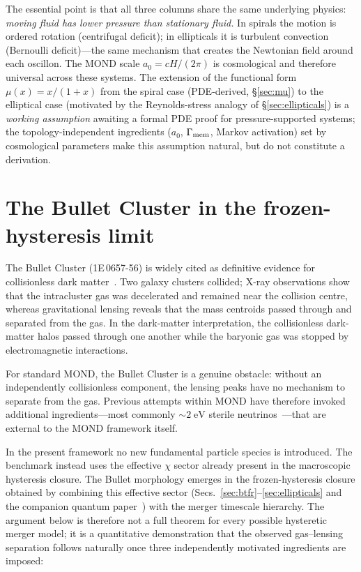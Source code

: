 \documentclass[11pt]{article}
\begin{document}
The essential point is that all three columns share the same
underlying physics: \emph{moving fluid has lower pressure than
stationary fluid.}  In spirals the motion is ordered rotation
(centrifugal deficit); in ellipticals it is turbulent convection
(Bernoulli deficit)---the same mechanism that creates the
Newtonian field around each oscillon.  The MOND scale
$a_0=cH/(2\pi)$ is cosmological and therefore universal across
these systems.  The extension of the functional form
$\mu(x)=x/(1+x)$ from the spiral case (PDE-derived,
§\ref{sec:mu}) to the elliptical case (motivated by the
Reynolds-stress analogy of §\ref{sec:ellipticals}) is a
\emph{working assumption} awaiting a formal PDE proof for
pressure-supported systems; the topology-independent
ingredients ($a_0$, $\Gamma_{\rm mem}$, Markov activation)
set by cosmological parameters make this assumption natural,
but do not constitute a derivation.

\section{The Bullet Cluster in the frozen-hysteresis limit}\label{sec:bullet}

The Bullet Cluster (1E\,0657-56) is widely cited as definitive
evidence for collisionless dark matter~\cite{Clowe2006}.
Two galaxy clusters collided; X-ray observations show that the
intracluster gas was decelerated and remained near the collision
centre, whereas gravitational lensing reveals that the mass
centroids passed through and separated from the gas.
In the dark-matter interpretation, the collisionless dark-matter
halos passed through one another while the baryonic gas was
stopped by electromagnetic interactions.

For standard MOND, the Bullet Cluster is a genuine obstacle:
without an independently collisionless component, the lensing
peaks have no mechanism to separate from the gas.  Previous
attempts within MOND have therefore invoked additional
ingredients---most commonly $\sim\!2\;\mathrm{eV}$ sterile
neutrinos~\cite{Angus2008}---that are external to the MOND
framework itself.

In the present framework no new fundamental particle species is
introduced.  The benchmark instead uses the effective $\chi$ sector
already present in the macroscopic hysteresis closure.  The Bullet
morphology emerges in the frozen-hysteresis closure obtained by combining
this effective sector
(Secs.~\ref{sec:btfr}--\ref{sec:ellipticals} and the companion
quantum paper~\cite{Lotishvili2026Q}) with the merger
timescale hierarchy.  The argument below is therefore not a
full theorem for every possible hysteretic merger model; it is
a quantitative demonstration that the observed gas--lensing
separation follows naturally once three independently motivated
ingredients are imposed:
\end{document}
